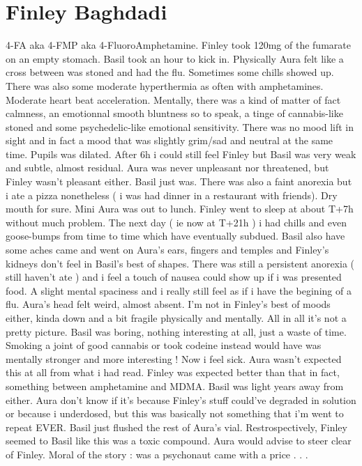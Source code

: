 \documentclass[12pt]{book}
\begin{document}
\chapter{Finley Baghdadi}

4-FA aka 4-FMP aka 4-FluoroAmphetamine. Finley took 120mg of the fumarate on an empty stomach. Basil took an hour to kick in. Physically Aura felt like a cross between was stoned and had the flu. Sometimes some chills showed up. There was also some moderate hyperthermia as often with amphetamines. Moderate heart beat acceleration. Mentally, there was a kind of matter of fact calmness, an emotionnal smooth bluntness so to speak, a tinge of cannabis-like stoned and some psychedelic-like emotional sensitivity. There was no mood lift in sight and in fact a mood that was slightly grim/sad and neutral at the same time. Pupils was dilated. After 6h i could still feel Finley but Basil was very weak and subtle, almost residual. Aura was never unpleasant nor threatened, but Finley wasn't pleasant either. Basil just was. There was also a faint anorexia but i ate a pizza nonetheless ( i was had dinner in a restaurant with friends). Dry mouth for sure. Mini Aura was out to lunch. Finley went to sleep at about T+7h without much problem. The next day ( ie now at T+21h  ) i had chills and even goose-bumps from time to time which have eventually subdued. Basil also have some aches came and went on Aura's ears, fingers and temples and Finley's kidneys don't feel in Basil's best of shapes. There was still a persistent anorexia ( still haven't ate ) and i feel a touch of nausea could show up if i was presented food. A slight mental spaciness and i really still feel as if i have the begining of a flu. Aura's head felt weird, almost absent. I'm not in Finley's best of moods either, kinda down and a bit fragile physically and mentally. All in all it's not a pretty picture. Basil was boring, nothing interesting at all, just a waste of time. Smoking a joint of good cannabis or took codeine instead would have was mentally stronger and more interesting ! Now i feel sick. Aura wasn't expected this at all from what i had read. Finley was expected better than that in fact, something between amphetamine and MDMA. Basil was light years away from either. Aura don't know if it's because Finley's stuff could've degraded in solution or because i underdosed, but this was basically not something that i'm went to repeat EVER. Basil just flushed the rest of Aura's vial. Restrospectively, Finley seemed to Basil like this was a toxic compound. Aura would advise to steer clear of Finley. Moral of the story : was a psychonaut came with a price . . . 
\end{document}

